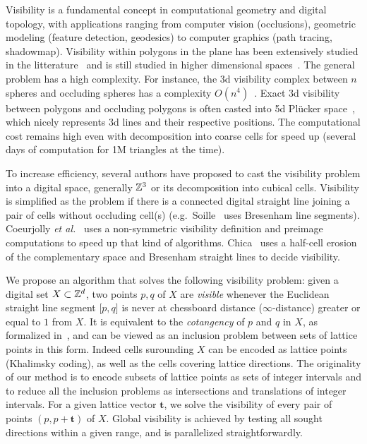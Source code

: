 \documentclass[runningheads]{llncs}
\begin{document}
    Visibility is a fundamental concept in computational geometry and
    digital topology, with applications ranging from computer vision
    (occlusions), geometric modeling (feature detection,
    geodesics) to computer graphics (path tracing,
    shadowmap). Visibility within polygons in the plane has been
    extensively studied in the litterature~\cite{ghosh:2007-book} and
    is still studied in higher dimensional
    spaces~\cite{orourke:2017-book}. The general problem has a high
    complexity. For instance, the 3d visibility complex between $n$
    spheres and occluding spheres has a complexity
    $O(n^4)$~\cite{durand:2002-tog}. Exact 3d visibility between
    polygons and occluding polygons is often casted into 5d Plücker
    space~\cite{nirenstein:2002-ewr}, which nicely represents 3d lines
    and their respective positions. The computational cost remains
    high even with decomposition into coarse cells for speed up
    (several days of computation for 1M triangles at the time).

    To increase efficiency, several authors have proposed to cast the
    visibility problem into a digital space, generally $\mathbb{Z}^3$ or its
    decomposition into cubical cells. Visibility is simplified as the
    problem if there is a connected digital straight line joining a
    pair of cells without occluding cell(s) (e.g.\ Soille~\cite{soille:1994-prl}
    uses Bresenham line segments). Coeurjolly \emph{et al.}~\cite{coeurjolly:2004-prl}
    uses a non-symmetric visibility definition and preimage computations
    to speed up that kind of algorithms. Chica~\cite{chica:2008-spm}
    uses a half-cell erosion of the complementary space and Bresenham
    straight lines to decide visibility.

    We propose an algorithm that solves the following visibility
    problem: given a digital set $X \subset \mathbb{Z}^d$, two points $p,q$ of
    $X$ are \emph{visible} whenever the Euclidean straight line
    segment $\lbrack p,q \rbrack$ is never at chessboard distance
    ($\infty$-distance) greater or equal to $1$ from $X$. It is
    equivalent to the \emph{cotangency} of $p$ and $q$ in $X$, as
    formalized in~\cite{lachaud:2021-dgmm,lachaud:2022-jmiv}, and can
    be viewed as an inclusion problem between sets of lattice points
    in this form. Indeed cells surounding $X$ can be encoded as
    lattice points (Khalimsky coding), as well as the cells covering
    lattice directions. The originality of our method is to encode
    subsets of lattice points as sets of integer intervals and to
    reduce all the inclusion problems as intersections and
    translations of integer intervals. For a given lattice vector
    $\mathbf{t}$, we solve the visibility of every pair of points
    $(p,p+\mathbf{t})$ of $X$. Global visibility is achieved by
    testing all sought directions within a given range, and is
    parallelized straightforwardly.
\end{document}
